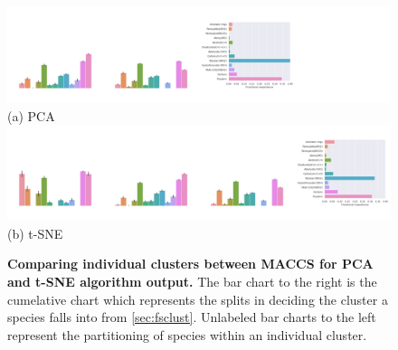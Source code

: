 \begin{landscape}
\begin{figure}[H]

         \includegraphics[width=1.6\textheight]{./outputs/PCA/maccs/group.png}
         \\ (a) PCA \\
     \hfill
            \includegraphics[width=1.6\textheight]{./outputs/t-SNE/maccs/group.png}
        \\ (b) t-SNE
        \caption{ \textbf{Comparing individual clusters between MACCS for PCA and t-SNE algorithm output.} The bar chart to the right is the cumelative chart which represents the splits in deciding the cluster a species falls into from \autoref{sec:fsclust}. Unlabeled bar charts to the left represent the partitioning of species within an individual cluster.}
        \label{fig:biMACCS}
\end{figure}
\end{landscape}



